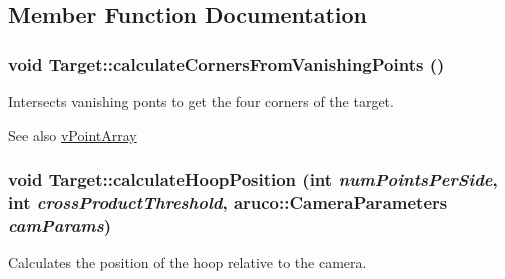 \subsection{Member Function Documentation}
\hypertarget{classTarget_a8e4a735a5ce6ebaa32ac83712ec4e75f}{
\subsubsection[{calculateCornersFromVanishingPoints}]{\setlength{\rightskip}{0pt plus 5cm}void Target::calculateCornersFromVanishingPoints ()}}
\label{classTarget_a8e4a735a5ce6ebaa32ac83712ec4e75f}


Intersects vanishing ponts to get the four corners of the target. 

\begin{DoxySeeAlso}{See also}
\hyperlink{classTarget_a55d4dc8c3f14d8229ee0d05fcebe0b42}{vPointArray} 
\end{DoxySeeAlso}
\hypertarget{classTarget_a888695431f7e2c1cfaba678dbd99b6d1}{
\subsubsection[{calculateHoopPosition}]{\setlength{\rightskip}{0pt plus 5cm}void Target::calculateHoopPosition (int {\em numPointsPerSide}, \/  int {\em crossProductThreshold}, \/  aruco::CameraParameters {\em camParams})}}
\label{classTarget_a888695431f7e2c1cfaba678dbd99b6d1}


Calculates the position of the hoop relative to the camera. 

